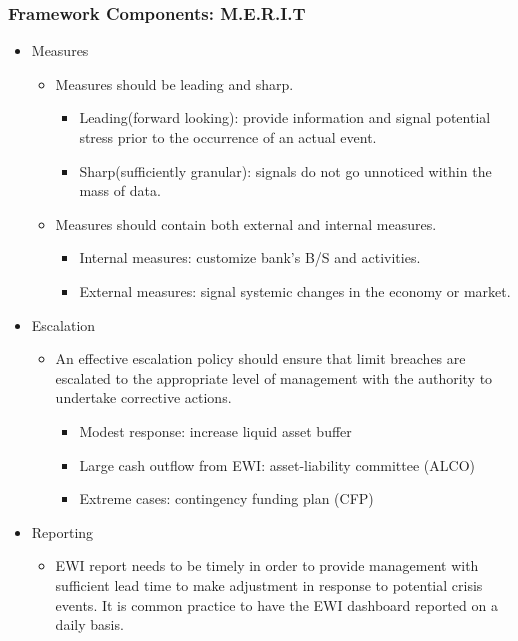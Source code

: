 \subsubsection{Framework Components: M.E.R.I.T}
\begin{itemize}
\item Measures
    \begin{itemize}
    \item Measures should be leading and sharp.
        \begin{itemize}
        \item Leading(forward looking): provide information and signal potential stress prior to the occurrence of an actual event.
        \item Sharp(sufficiently granular): signals do not go unnoticed within the mass of data.
        \end{itemize}
    \item Measures should contain both external and internal measures.
        \begin{itemize}
        \item Internal measures: customize bank's B/S and activities.
        \item External measures: signal systemic changes in the economy or market.
        \end{itemize}
    \end{itemize}
    
\item Escalation
    \begin{itemize}
    \item An effective escalation policy should ensure that limit breaches are escalated to the appropriate level of management with the authority to undertake corrective actions.
        \begin{itemize}
        \item Modest response: increase liquid asset buffer
        \item Large cash outflow from EWI: asset-liability committee (ALCO)
        \item Extreme cases: contingency funding plan (CFP)
        \end{itemize}
    \end{itemize}
    
\item Reporting
    \begin{itemize}
    \item EWI report needs to be timely in order to provide management with sufficient lead time to make adjustment in response to potential crisis events. It is common practice to have the EWI dashboard reported on a daily basis.
    \end{itemize}
    

\end{itemize}
